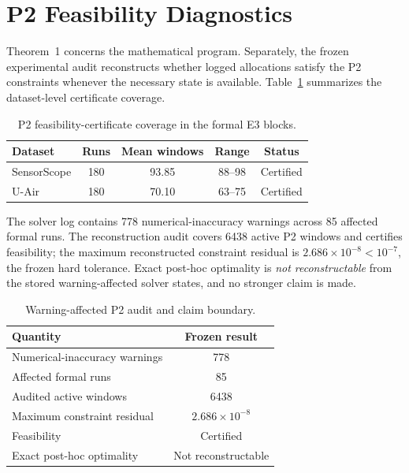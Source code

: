 \documentclass[letterpaper,journal]{IEEEtran}
\begin{document}
\section{P2 Feasibility Diagnostics}
\label{app:p2_diagnostics}

Theorem~1 concerns the mathematical program.  Separately, the frozen
experimental audit reconstructs whether logged allocations satisfy the P2
constraints whenever the necessary state is available.  Table~\ref{tab:app_p2_coverage}
summarizes the dataset-level certificate coverage.

\begin{table}[t]
\centering
\caption{P2 feasibility-certificate coverage in the formal E3 blocks.}
\label{tab:app_p2_coverage}
\footnotesize
\setlength{\tabcolsep}{4pt}
\begin{tabular}{lcccc}
\toprule
Dataset & Runs & Mean windows & Range & Status\\
\midrule
SensorScope & 180 & 93.85 & 88--98 & Certified \\
U-Air & 180 & 70.10 & 63--75 & Certified \\
\bottomrule
\end{tabular}
\end{table}

The solver log contains 778 numerical-inaccuracy warnings across
85 affected formal runs.  The reconstruction audit covers
6438 active P2 windows and certifies feasibility; the maximum
reconstructed constraint residual is
$2.686\times10^{-8}<10^{-7}$, the frozen hard tolerance.  Exact post-hoc
optimality is \emph{not reconstructable} from the stored warning-affected
solver states, and no stronger claim is made.

\begin{table}[t]
\centering
\caption{Warning-affected P2 audit and claim boundary.}
\label{tab:app_p2_warning_audit}
\footnotesize
\setlength{\tabcolsep}{5pt}
\begin{tabular}{lc}
\toprule
Quantity & Frozen result\\
\midrule
Numerical-inaccuracy warnings & 778\\
Affected formal runs & 85\\
Audited active windows & 6438\\
Maximum constraint residual & $2.686\times10^{-8}$\\
Feasibility & Certified\\
Exact post-hoc optimality & Not reconstructable\\
\bottomrule
\end{tabular}
\end{table}
\end{document}
